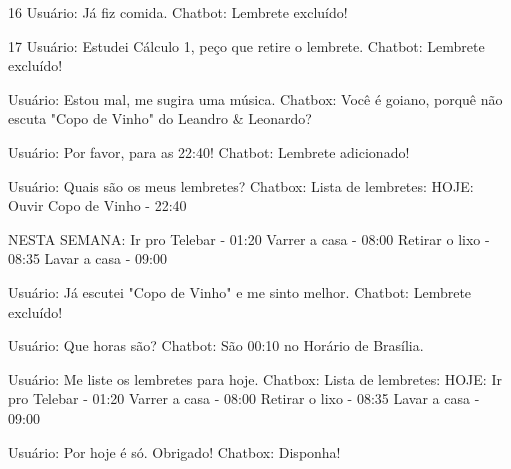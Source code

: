 16
Usuário: Já fiz comida.
Chatbot: Lembrete excluído!

17
Usuário: Estudei Cálculo 1, peço que retire o lembrete.
Chatbot: Lembrete excluído!

Usuário: Estou mal, me sugira uma música.
Chatbox: Você é goiano, porquê não escuta "Copo de Vinho" do Leandro & Leonardo?

Usuário: Por favor, para as 22:40!
Chatbot: Lembrete adicionado!

Usuário: Quais são os meus lembretes?
Chatbox: Lista de lembretes:
	HOJE:
	Ouvir Copo de Vinho - 22:40

	NESTA SEMANA:
	Ir pro Telebar - 01:20
	Varrer a casa - 08:00
	Retirar o lixo - 08:35
	Lavar a casa - 09:00

Usuário: Já escutei "Copo de Vinho" e me sinto melhor.
Chatbot: Lembrete excluído!

Usuário: Que horas são?
Chatbot: São 00:10 no Horário de Brasília.

Usuário: Me liste os lembretes para hoje.
Chatbox: Lista de lembretes:
	HOJE:
	Ir pro Telebar - 01:20
	Varrer a casa - 08:00
	Retirar o lixo - 08:35
	Lavar a casa - 09:00

Usuário: Por hoje é só. Obrigado!
Chatbox: Disponha!